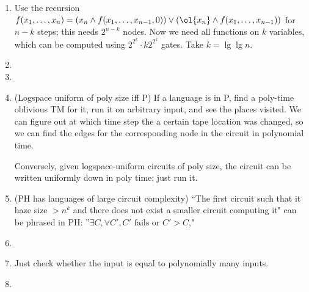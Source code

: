 
\begin{enumerate}
\item Use the recursion $f(x_1,\ldots, x_n)=(x_n\wedge f(x_1,\ldots, x_{n-1},0))\vee (\ol{x_n}\wedge f(x_1,\ldots, x_{n-1}))$ for $n-k$ steps; this needs $2^{n-k}$ nodes. Now we need 
all functions on $k$ variables, which can be computed using $2^{2^k}\cdot k2^{2^k}$ gates. Take $k=\lg\lg n$.
\item
\item
\item (Logspace uniform of poly size iff P) If a language is in P, find a poly-time oblivious TM for it, run it on arbitrary input, and see the places visited. We can figure out at which time step the a certain tape location was changed, so we can find the edges for the corresponding node in the circuit in polynomial time.

Conversely, given logspace-uniform circuits of poly size, the circuit can be written uniformly down in poly time; just run it.
\item (PH has languages of large circuit complexity) ``The first circuit such that it haze size $>n^k$ and there does not exist a smaller circuit computing it" can be phrased in PH: ''$\exists C,\forall C', C'\text{ fails or }C'>C$,"
\item
\item  Just check whether the input is equal to polynomially many inputs.
\item
\end{enumerate}

